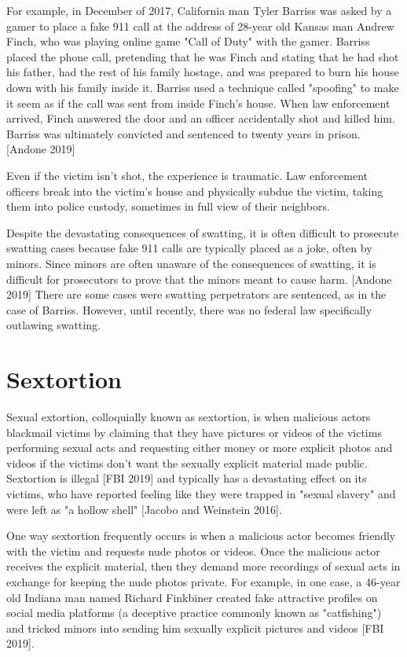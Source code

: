 \documentclass[class=book, crop=false]{standalone}
\begin{document}
For example, in December of 2017, California man Tyler Barriss was asked by a gamer to place a fake 911 call at the address of 28-year old Kansas man Andrew Finch, who was playing online game "Call of Duty" with the gamer. Barriss placed the phone call, pretending that he was Finch and stating that he had shot his father, had the rest of his family hostage, and was prepared to burn his house down with his family inside it. Barriss used a technique called "spoofing" to make it seem as if the call was sent from inside Finch's house. When law enforcement arrived, Finch answered the door and an officer accidentally shot and killed him. Barriss was ultimately convicted and sentenced to twenty years in prison. [Andone 2019]

Even if the victim isn't shot, the experience is traumatic. Law enforcement officers break into the victim's house and physically subdue the victim, taking them into police custody, sometimes in full view of their neighbors.

Despite the devastating consequences of swatting, it is often difficult to prosecute swatting cases because fake 911 calls are typically placed as a joke, often by minors. Since minors are often unaware of the consequences of swatting, it is difficult for prosecutors to prove that the minors meant to cause harm. [Andone 2019] There are some cases were swatting perpetrators are sentenced, as in the case of Barriss. However, until recently, there was no federal law specifically outlawing swatting.

\section{Sextortion}

Sexual extortion, colloquially known as sextortion, is when malicious actors blackmail victims by claiming that they have pictures or videos of the victims performing sexual acts and requesting either money or more explicit photos and videos if the victims don't want the sexually explicit material made public. Sextortion is illegal [FBI 2019] and typically has a devastating effect on its victims, who have reported feeling like they were trapped in "sexual slavery" and were left as "a hollow shell" [Jacobo and Weinstein 2016].

One way sextortion frequently occurs is when a malicious actor becomes friendly with the victim and requests nude photos or videos. Once the malicious actor receives the explicit material, then they demand more recordings of sexual acts in exchange for keeping the nude photos private. For example, in one case, a 46-year old Indiana man named Richard Finkbiner created fake attractive profiles on social media platforms (a deceptive practice commonly known as "catfishing") and tricked minors into sending him sexually explicit pictures and videos [FBI 2019].
\end{document}
